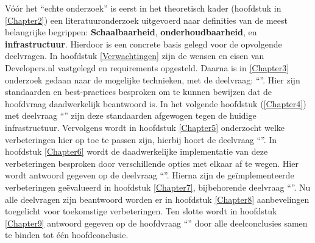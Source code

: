Vóór het \enquote{echte onderzoek} is eerst in het theoretisch kader (hoofdstuk in \ref{Chapter2}) een literatuuronderzoek uitgevoerd naar definities van de meest belangrijke begrippen: \textbf{Schaalbaarheid}, \textbf{onderhoudbaarheid}, en \textbf{infrastructuur}. Hierdoor is een concrete basis gelegd voor de opvolgende deelvragen. In hoofdstuk \ref{Verwachtingen} zijn de wensen en eisen van Developers.nl vastgelegd en requirements opgesteld. Daarna is in \ref{Chapter3} onderzoek gedaan naar de mogelijke technieken, met de deelvraag: \enquote{\deeltechnieken}. Hier zijn standaarden en best-practices besproken om te kunnen bewijzen dat de hoofdvraag daadwerkelijk beantwoord is. In het volgende hoofdstuk (\ref{Chapter4}) met deelvraag \enquote{\deelhuidig} zijn deze standaarden afgewogen tegen de huidige infrastructuur. Vervolgens wordt in hoofdstuk \ref{Chapter5} onderzocht welke verbeteringen hier op toe te passen zijn, hierbij hoort de deelvraag \enquote{\deelverbetering}. In hoofdstuk \ref{Chapter6} wordt de daadwerkelijke implementatie van deze verbeteringen besproken door verschillende opties met elkaar af te wegen. Hier wordt antwoord gegeven op de deelvraag \enquote{\deelverbetering}. Hierna zijn de geïmplementeerde verbeteringen geëvalueerd in hoofdstuk \ref{Chapter7}, bijbehorende deelvraag \enquote{\deelrequirements}. Nu alle deelvragen zijn beantwoord worden er in hoofdstuk \ref{Chapter8} aanbevelingen toegelicht voor toekomstige verbeteringen. Ten slotte wordt in hoofdstuk \ref{Chapter9} antwoord gegeven op de hoofdvraag \enquote{\hoofdvraagname} door alle deelconclusies samen te binden tot één hoofdconclusie.